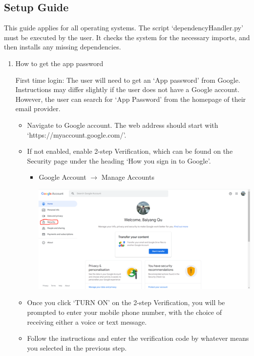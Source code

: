 \documentclass{article}
\begin{document}
\subsection{Setup Guide}
This guide applies for all operating systems. The script ‘dependencyHandler.py’ must be executed by the user. It checks the system for the necessary imports, and then installs any missing dependencies.
\begin{enumerate}
\item How to get the app password
    \begin{description}
        First time login: The user will need to get an ‘App password’ from Google. Instructions may differ slightly if the user does not have a Google account. However, the user can search for ‘App Password’ from the homepage of their email provider.
    \end{description}
    \begin{itemize}
        \item Navigate to Google account. The web address should start with ‘https://myaccount.google.com/’.
        \item If not enabled, enable 2-step Verification, which can be found on the Security page under the heading ‘How you sign in to Google’.
        \begin{itemize}
            \item  Google Account $\rightarrow$  Manage Accounts
            \begin{center}
                \includegraphics[]{google security.png}
            \end{center}
        \end{itemize}
        \item Once you click ‘TURN ON’ on the 2-step Verification, you will be prompted to enter your mobile phone number, with the choice of receiving either a voice or text message.
        \item Follow the instructions and enter the verification code by whatever means you selected in the previous step.

\end{itemize}
\end{enumerate}
\end{document}
